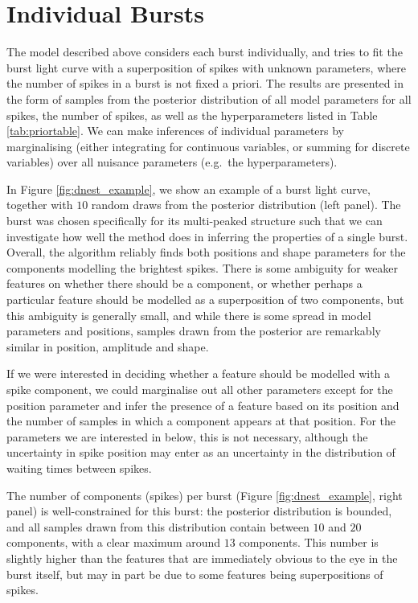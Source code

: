 \documentclass[12pt]{emulateapj}
\begin{document}
\section{Individual Bursts}
\label{ch6:oneburst}

The model described above considers each burst individually, and tries to fit the burst light curve with a superposition of spikes with unknown parameters, where the number of
spikes in a burst is not fixed a priori. The results are presented in the form of samples from the posterior distribution of all model parameters for all spikes, the number of spikes,
as well as the hyperparameters listed in Table \ref{tab:priortable}. We can make inferences of individual parameters by marginalising (either integrating for continuous variables, or summing for
discrete variables) over all nuisance parameters (e.g.\ the hyperparameters). 

In Figure \ref{fig:dnest_example}, we show an example of a burst light curve, together with $10$ random draws from the posterior distribution (left panel).
The burst was chosen specifically for its multi-peaked structure such that we can investigate how well the method does in inferring the properties 
of a single burst. Overall, the algorithm reliably finds both positions and shape parameters for the components modelling
the brightest spikes. There is some ambiguity for weaker features on whether there should be a component, or whether perhaps a
particular feature should be modelled as a superposition of two components, but this ambiguity is generally small, and while there is some
spread in model parameters and positions, samples drawn from the posterior are remarkably similar in position, amplitude and shape. 

If we were interested in deciding whether a feature should be modelled with a spike component, we could marginalise out all other parameters
except for the position parameter and infer the presence of a feature based on its position and the number of samples in which a component appears at
that position. For the parameters we are interested in below, this is not necessary, although the uncertainty in spike position may enter as an 
uncertainty in the distribution of waiting times between spikes.

The number of components (spikes) per burst (Figure \ref{fig:dnest_example}, right panel) is well-constrained for this burst: the posterior distribution is bounded, and all samples drawn
from this distribution contain between $10$ and $20$ components, with a 
clear maximum around $13$ components. This number is slightly higher than the features that are immediately obvious to the eye 
in the burst itself, but may in part be due to some features being superpositions of spikes. 
\end{document}
